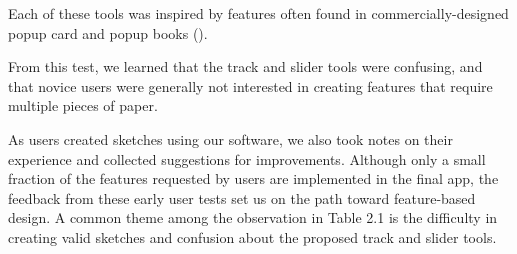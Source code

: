 Each of these tools was inspired by features often found in
commercially-designed popup card and popup books
(\citet{birmingham1997pop}).

From this test, we learned that the track and slider tools were
confusing, and that novice users were generally not interested in
creating features that require multiple pieces of paper.

As users created sketches using our software, we also took notes on
their experience and collected suggestions for improvements. Although
only a small fraction of the features requested by users are implemented
in the final app, the feedback from these early user tests set us on the
path toward feature-based design. A common theme among the observation
in Table 2.1 is the difficulty in creating valid sketches and confusion
about the proposed track and slider tools.

